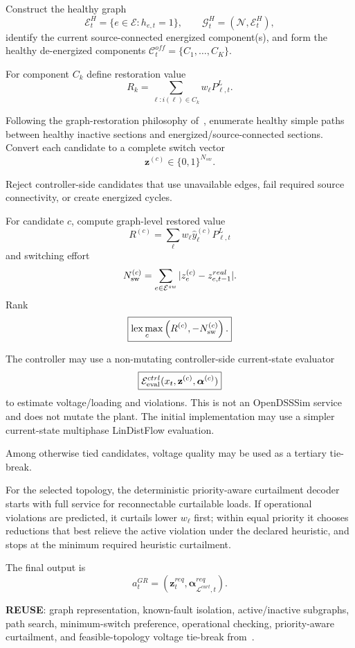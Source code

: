 \documentclass[11pt]{article}
\newcommand{\lexmax}{\operatorname*{lex\,max}}
\begin{document}
Construct the healthy graph
\[
\mathcal E_t^H=\{e\in\mathcal E:h_{e,t}=1\},\qquad
\mathcal G_t^H=(\mathcal N,\mathcal E_t^H),
\]
identify the current source-connected energized component(s), and form the healthy
de-energized components $\mathcal C_t^{off}=\{C_1,\dots,C_K\}$.

For component $C_k$ define restoration value
\[
\boxed{
R_k=\sum_{\ell:i(\ell)\in C_k}w_\ell P_{\ell,t}^L.}
\]

Following the graph-restoration philosophy of~\cite{Vedullapalli2020}, enumerate
healthy simple paths between healthy inactive sections and energized/source-connected
sections. Convert each candidate to a complete switch vector
\[
\mathbf z^{(c)}\in\{0,1\}^{N_{sw}}.
\]

Reject controller-side candidates that use unavailable edges, fail required source
connectivity, or create energized cycles.

For candidate $c$, compute graph-level restored value
\[
R^{(c)}=\sum_\ell w_\ell\hat y_\ell^{(c)}P_{\ell,t}^{L}
\]
and switching effort
\[
N_{\rm sw}^{(c)}
=
\sum_{e\in\mathcal E^{sw}}|z_e^{(c)}-z_{e,t-1}^{real}|.
\]
Rank
\[
\boxed{
\lexmax_c\left(R^{(c)},-N_{\rm sw}^{(c)}\right).}
\]

The controller may use a non-mutating controller-side current-state evaluator
\[
\boxed{
\mathcal E_{\rm eval}^{ctrl}
(x_t,\mathbf z^{(c)},\boldsymbol\alpha^{(c)})}
\]
to estimate voltage/loading and violations. This is not an OpenDSSSim service and
does not mutate the plant. The initial implementation may use a simpler
current-state multiphase LinDistFlow evaluation.

Among otherwise tied candidates, voltage quality may be used as a tertiary tie-break.

For the selected topology, the deterministic priority-aware curtailment decoder
starts with full service for reconnectable curtailable loads. If operational
violations are predicted, it curtails lower $w_\ell$ first; within equal priority
it chooses reductions that best relieve the active violation under the declared
heuristic, and stops at the minimum required heuristic curtailment.

The final output is
\[
\boxed{
a_t^{GR}
=
(\mathbf z_t^{req},\boldsymbol\alpha_{\mathcal L^{curt},t}^{req}).}
\]

\textbf{REUSE}: graph representation, known-fault isolation, active/inactive
subgraphs, path search, minimum-switch preference, operational checking,
priority-aware curtailment, and feasible-topology voltage tie-break
from~\cite{Vedullapalli2020}.
\end{document}
